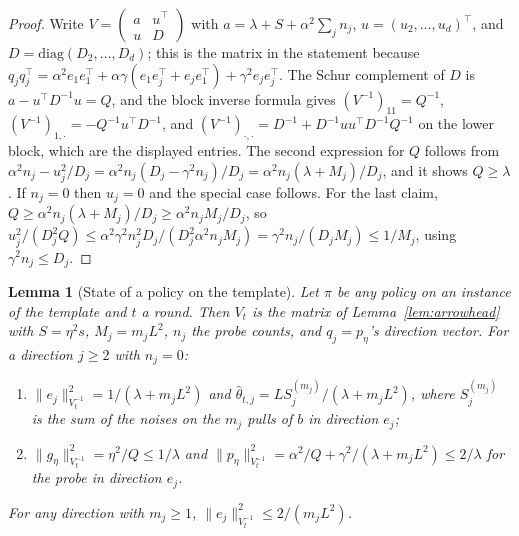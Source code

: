 \documentclass{article}
\newtheorem{lemma}{Lemma}
\theoremstyle{definition}
\theoremstyle{remark}
\theoremstyle{remark}
\begin{document}
\begin{proof}
Write $V=\begin{pmatrix}a&u^\top\\ u&D\end{pmatrix}$ with
$a=\lambda+S+\alpha^2\sum_jn_j$, $u=(u_2,\dots,u_d)^\top$, and
$D=\mathrm{diag}(D_2,\dots,D_d)$; this is the matrix in the statement because
$q_jq_j^\top=\alpha^2e_1e_1^\top+\alpha \gamma(e_1e_j^\top+e_je_1^\top)+\gamma^2e_je_j^\top$.
The Schur complement of $D$ is $a-u^\top D^{-1}u=Q$, and the block inverse
formula gives
$(V^{-1})_{11}=Q^{-1}$, $(V^{-1})_{1,\cdot}=-Q^{-1}u^\top D^{-1}$, and
$(V^{-1})_{\cdot,\cdot}=D^{-1}+D^{-1}uu^\top D^{-1}Q^{-1}$ on the lower block,
which are the displayed entries. The second expression for $Q$ follows from
$\alpha^2n_j-u_j^2/D_j=\alpha^2n_j(D_j-\gamma^2n_j)/D_j=\alpha^2n_j(\lambda+M_j)/D_j$,
and it shows $Q\ge\lambda$. If $n_j=0$ then $u_j=0$ and the special case
follows. For the last claim, $Q\ge\alpha^2n_j(\lambda+M_j)/D_j\ge\alpha^2n_jM_j/D_j$,
so $u_j^2/(D_j^2Q)\le\alpha^2\gamma^2n_j^2D_j/(D_j^2\alpha^2n_jM_j)=\gamma^2n_j/(D_jM_j)\le1/M_j$,
using $\gamma^2n_j\le D_j$.
\end{proof}

\begin{lemma}[State of a policy on the template]
\label{lem:cat-state}
Let $\pi$ be any policy on an instance of the template and $t$ a round. Then
$V_t$ is the matrix of Lemma~\ref{lem:arrowhead} with $S=\eta^2s$, $M_j=m_jL^2$,
$n_j$ the probe counts, and $q_j=p_\eta$'s direction vector. For a direction
$j\ge2$ with $n_j=0$:
\begin{enumerate}[itemsep=1pt,topsep=1pt,leftmargin=*]
\item[(a)] $\|e_j\|^2_{V_t^{-1}}=1/(\lambda+m_jL^2)$ and
$\widehat\theta_{t,j}=LS_j^{(m_j)}/(\lambda+m_jL^2)$, where $S_j^{(m_j)}$ is the
sum of the noises on the $m_j$ pulls of $b$ in direction $e_j$;
\item[(b)] $\|g_\eta\|^2_{V_t^{-1}}=\eta^2/Q\le1/\lambda$ and
$\|p_\eta\|^2_{V_t^{-1}}=\alpha^2/Q+\gamma^2/(\lambda+m_jL^2)\le2/\lambda$ for the probe
in direction $e_j$.
\end{enumerate}
For any direction with $m_j\ge1$, $\|e_j\|^2_{V_t^{-1}}\le2/(m_jL^2)$.
\end{lemma}
\end{document}
